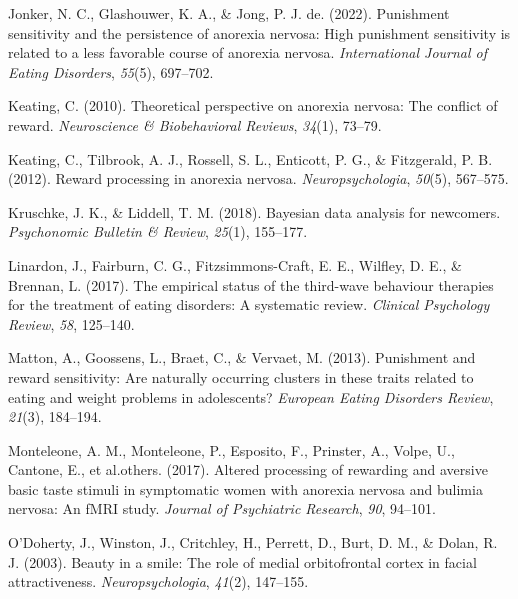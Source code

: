 \documentclass[
  man,floatsintext]{apa6}
\newlength{\cslhangindent}
\newlength{\cslentryspacingunit} %
\newenvironment{CSLReferences}[2] %
 {%
  \setlength{\parindent}{0pt}
  \ifodd #1
  \let\oldpar\par
  \def\par{\hangindent=\cslhangindent\oldpar}
  \fi
  \setlength{\parskip}{#2\cslentryspacingunit}
 }%
 {}
\begin{document}
\begin{CSLReferences}{1}{0}
\leavevmode{}%
Jonker, N. C., Glashouwer, K. A., \& Jong, P. J. de. (2022). Punishment sensitivity and the persistence of anorexia nervosa: High punishment sensitivity is related to a less favorable course of anorexia nervosa. \emph{International Journal of Eating Disorders}, \emph{55}(5), 697--702.

\leavevmode{}%
Keating, C. (2010). Theoretical perspective on anorexia nervosa: The conflict of reward. \emph{Neuroscience \& Biobehavioral Reviews}, \emph{34}(1), 73--79.

\leavevmode{}%
Keating, C., Tilbrook, A. J., Rossell, S. L., Enticott, P. G., \& Fitzgerald, P. B. (2012). Reward processing in anorexia nervosa. \emph{Neuropsychologia}, \emph{50}(5), 567--575.

\leavevmode{}%
Kruschke, J. K., \& Liddell, T. M. (2018). Bayesian data analysis for newcomers. \emph{Psychonomic Bulletin \& Review}, \emph{25}(1), 155--177.

\leavevmode{}%
Linardon, J., Fairburn, C. G., Fitzsimmons-Craft, E. E., Wilfley, D. E., \& Brennan, L. (2017). The empirical status of the third-wave behaviour therapies for the treatment of eating disorders: A systematic review. \emph{Clinical Psychology Review}, \emph{58}, 125--140.

\leavevmode{}%
Matton, A., Goossens, L., Braet, C., \& Vervaet, M. (2013). Punishment and reward sensitivity: Are naturally occurring clusters in these traits related to eating and weight problems in adolescents? \emph{European Eating Disorders Review}, \emph{21}(3), 184--194.

\leavevmode{}%
Monteleone, A. M., Monteleone, P., Esposito, F., Prinster, A., Volpe, U., Cantone, E., et al.others. (2017). Altered processing of rewarding and aversive basic taste stimuli in symptomatic women with anorexia nervosa and bulimia nervosa: An fMRI study. \emph{Journal of Psychiatric Research}, \emph{90}, 94--101.

\leavevmode{}%
O'Doherty, J., Winston, J., Critchley, H., Perrett, D., Burt, D. M., \& Dolan, R. J. (2003). Beauty in a smile: The role of medial orbitofrontal cortex in facial attractiveness. \emph{Neuropsychologia}, \emph{41}(2), 147--155.


\end{CSLReferences}
\end{document}
